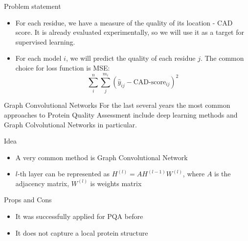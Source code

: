 \documentclass{beamer}
\begin{document}
\begin{frame}{Problem statement}
    \begin{itemize}
        \item For each residue, we have a measure of the quality of its location - CAD score. It is already evaluated experimentally,
        so we will use it as a target for supervised learning.
        \item For each model $i$, we will predict the quality of each residue $j$. The common choice for loss
        function is MSE:
        $$\displaystyle{\sum_i^n \sum_j^{m_i}}(\hat{y}_{ij} - \text{CAD-score}_{ij})^2$$
    \end{itemize}
\end{frame}
\begin{frame}{Graph Convolutional Networks}
    For the last several years the most common approaches to Protein Quality Assessment include deep learning methods and Graph
    Colvolutional Networks in particular.
    \begin{block}{Idea}
        \begin{itemize}
            \item A very common method is Graph Convolutional Network
            \item $l$-th layer can be represented as $H^{(l)} = AH^{(l-1)}W^{(l)}$, where $A$ is the adjacency matrix, $W^{(l)}$ is weights matrix
        \end{itemize}
    \end{block}
    \begin{block}{Props and Cons}
        \begin{itemize}
            \item It was successfully applied for PQA before
            \item It does not capture a local protein structure
        \end{itemize}
    \end{block}
\end{frame}
\end{document}
